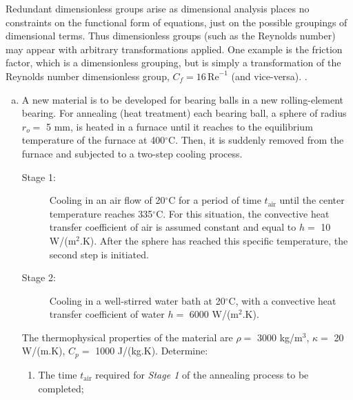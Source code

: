 \documentclass[calculator,datasheet,handbook]{exam}
\begin{document}
{\begin{question}
\begin{enumerate}[a)]
{        Redundant dimensionless groups arise as dimensional analysis
        places no constraints on the functional form of equations,
        just on the possible groupings of dimensional terms. Thus
        dimensionless groups (such as the Reynolds number) may appear
        with arbitrary transformations applied. One example is the
        friction factor, which is a dimensionless grouping, but is
        simply a transformation of the Reynolds number dimensionless
        group, $C_f=16\,\text{Re}^{-1}$ (and
        vice-versa). .  }
    \end{enumerate}
  \end{question}
}

\pagebreak 
\begin{question}
%  
  \begin{enumerate}[(a)]
    \item A new material is to be developed for bearing balls in a new rolling-element bearing. For annealing (heat treatment) each bearing ball, a sphere of radius $r_{o} =$ 5 mm, is heated in a furnace until it reaches to the equilibrium temperature of the furnace at 400$^{\circ}$C. Then, it is suddenly removed from the furnace and subjected to a two-step cooling process.
   \begin{description}
      \item[Stage 1:] Cooling in an air flow of 20$^{\circ}$C for a period of time $t_{\text{air}}$ until the center temperature reaches 335$^{\circ}$C. For this situation, the convective heat transfer coefficient of air is assumed constant and equal to $h =$ 10 W/(m$^{2}$.K). After the sphere has reached this specific temperature, the second step is initiated. 
      \item[Stage 2:] Cooling in a well-stirred water bath at 20$^{\circ}$C, with a convective heat transfer coefficient of water $h =$ 6000 W/(m$^{2}$.K). 
   \end{description}
   The thermophysical properties of the material are $\rho =$ 3000 kg/m$^{3}$, $\kappa =$ 20 W/(m.K), $C_{p} =$ 1000 J/(kg.K). Determine:
   \begin{enumerate}%
      \item The time $t_{\text{air}}$ required for {\it Stage 1} of the annealing process to be completed;
\end{enumerate}
\end{enumerate}
\end{question}
\end{document}
